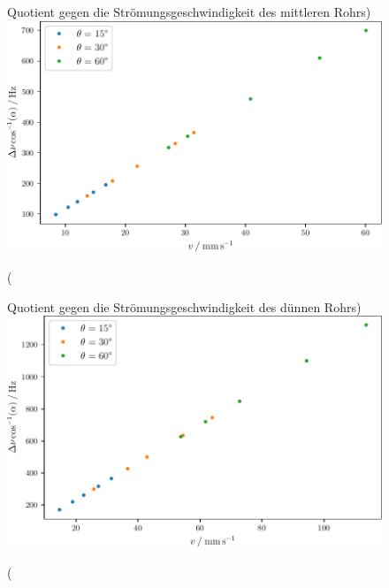 \begin{figure}
    \centering
    \caption(Quotient gegen die Strömungsgeschwindigkeit des mittleren Rohrs)
    \label{fig:middle}
    \includegraphics{build/middle.pdf}
\end{figure}
\begin{figure}
    \centering
    \caption(Quotient gegen die Strömungsgeschwindigkeit des dünnen Rohrs)
    \label{fig:tiny}
    \includegraphics{build/tiny.pdf}
\end{figure}
\FloatBarrier
